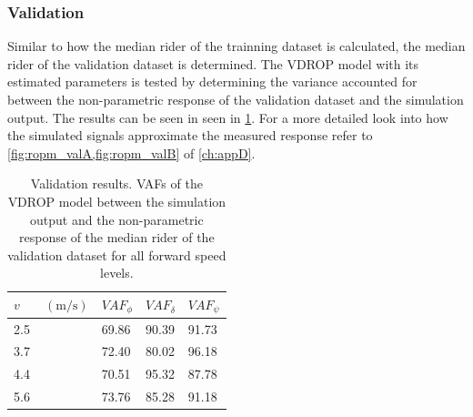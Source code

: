 \subsubsection{Validation}
Similar to how the median rider of the trainning dataset is calculated, the median rider of the validation dataset is determined. The VDROP model with its estimated parameters is tested by determining the variance accounted for between the non-parametric response of the  validation dataset and the simulation output. The results can be seen in seen in \cref{tb:validation}. For a more detailed look into  how the simulated signals approximate the measured response refer to \cref{fig:ropm_valA,fig:ropm_valB} of \cref{ch:appD}.
\begin{table}[!h]
  
    \centering
    \caption{Validation results. VAFs of the VDROP model  between the simulation output and the non-parametric response of the median rider of the validation dataset for all forward speed levels.}
    \begin{tabular}{l|lll}
        \label{tb:validation}
    $v\;\;\;\;\;\;\; (\si{\meter\per\second})$ & $\mathit{VAF}_\phi$ & $\mathit{VAF}_\delta$ & $\mathit{VAF}_\psi$ \\ \hline
    2.5                        & 69.86               & 90.39                 & 91.73               \\
    3.7                        & 72.40               & 80.02                 & 96.18               \\
    4.4                        & 70.51              & 95.32                 & 87.78               \\
    5.6                        & 73.76              & 85.28                 & 91.18              
    \end{tabular}
    \end{table}

